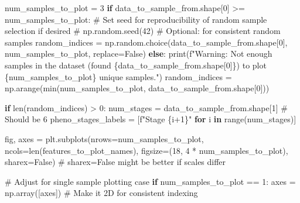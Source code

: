 \documentclass[
  letterpaper,
  DIV=11,
  numbers=noendperiod]{scrreprt}
\newenvironment{Shaded}{\begin{snugshade}}{\end{snugshade}}
\newcommand{\BuiltInTok}[1]{\textcolor[rgb]{0.00,0.23,0.31}{#1}}
\newcommand{\CommentTok}[1]{\textcolor[rgb]{0.37,0.37,0.37}{#1}}
\newcommand{\ControlFlowTok}[1]{\textcolor[rgb]{0.00,0.23,0.31}{\textbf{#1}}}
\newcommand{\DecValTok}[1]{\textcolor[rgb]{0.68,0.00,0.00}{#1}}
\newcommand{\KeywordTok}[1]{\textcolor[rgb]{0.00,0.23,0.31}{\textbf{#1}}}
\newcommand{\NormalTok}[1]{\textcolor[rgb]{0.00,0.23,0.31}{#1}}
\newcommand{\OperatorTok}[1]{\textcolor[rgb]{0.37,0.37,0.37}{#1}}
\newcommand{\SpecialCharTok}[1]{\textcolor[rgb]{0.37,0.37,0.37}{#1}}
\newcommand{\SpecialStringTok}[1]{\textcolor[rgb]{0.13,0.47,0.30}{#1}}
\newcommand{\VariableTok}[1]{\textcolor[rgb]{0.07,0.07,0.07}{#1}}
\begin{document}
\begin{Shaded}
\begin{Highlighting}[]
\NormalTok{num\_samples\_to\_plot }\OperatorTok{=} \DecValTok{3}
\ControlFlowTok{if}\NormalTok{ data\_to\_sample\_from.shape[}\DecValTok{0}\NormalTok{] }\OperatorTok{\textgreater{}=}\NormalTok{ num\_samples\_to\_plot:}
    \CommentTok{\# Set seed for reproducibility of random sample selection if desired}
    \CommentTok{\# np.random.seed(42) \# Optional: for consistent random samples}
\NormalTok{    random\_indices }\OperatorTok{=}\NormalTok{ np.random.choice(data\_to\_sample\_from.shape[}\DecValTok{0}\NormalTok{], num\_samples\_to\_plot, replace}\OperatorTok{=}\VariableTok{False}\NormalTok{)}
\ControlFlowTok{else}\NormalTok{:}
    \BuiltInTok{print}\NormalTok{(}\SpecialStringTok{f"Warning: Not enough samples in the dataset (found }\SpecialCharTok{\{}\NormalTok{data\_to\_sample\_from}\SpecialCharTok{.}\NormalTok{shape[}\DecValTok{0}\NormalTok{]}\SpecialCharTok{\}}\SpecialStringTok{) to plot }\SpecialCharTok{\{}\NormalTok{num\_samples\_to\_plot}\SpecialCharTok{\}}\SpecialStringTok{ unique samples."}\NormalTok{)}
\NormalTok{    random\_indices }\OperatorTok{=}\NormalTok{ np.arange(}\BuiltInTok{min}\NormalTok{(num\_samples\_to\_plot, data\_to\_sample\_from.shape[}\DecValTok{0}\NormalTok{]))}


\ControlFlowTok{if} \BuiltInTok{len}\NormalTok{(random\_indices) }\OperatorTok{\textgreater{}} \DecValTok{0}\NormalTok{:}
\NormalTok{    num\_stages }\OperatorTok{=}\NormalTok{ data\_to\_sample\_from.shape[}\DecValTok{1}\NormalTok{] }\CommentTok{\# Should be 6}
\NormalTok{    pheno\_stages\_labels }\OperatorTok{=}\NormalTok{ [}\SpecialStringTok{f"Stage }\SpecialCharTok{\{}\NormalTok{i}\OperatorTok{+}\DecValTok{1}\SpecialCharTok{\}}\SpecialStringTok{"} \ControlFlowTok{for}\NormalTok{ i }\KeywordTok{in} \BuiltInTok{range}\NormalTok{(num\_stages)]}

\NormalTok{    fig, axes }\OperatorTok{=}\NormalTok{ plt.subplots(nrows}\OperatorTok{=}\NormalTok{num\_samples\_to\_plot, ncols}\OperatorTok{=}\BuiltInTok{len}\NormalTok{(features\_to\_plot\_names),}
\NormalTok{                             figsize}\OperatorTok{=}\NormalTok{(}\DecValTok{18}\NormalTok{, }\DecValTok{4} \OperatorTok{*}\NormalTok{ num\_samples\_to\_plot), sharex}\OperatorTok{=}\VariableTok{False}\NormalTok{) }\CommentTok{\# sharex=False might be better if scales differ}

    \CommentTok{\# Adjust for single sample plotting case}
    \ControlFlowTok{if}\NormalTok{ num\_samples\_to\_plot }\OperatorTok{==} \DecValTok{1}\NormalTok{:}
\NormalTok{        axes }\OperatorTok{=}\NormalTok{ np.array([axes]) }\CommentTok{\# Make it 2D for consistent indexing}


\end{Highlighting}
\end{Shaded}
\end{document}
